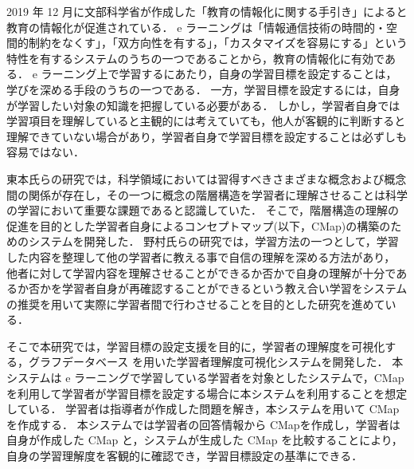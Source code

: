 \begin{titlepage}

    2019 年 12 月に文部科学省が作成した「教育の情報化に関する手引き」\cite{tebiki}によると教育の情報化が促進されている．
    e ラーニング\cite{e}は「情報通信技術の時間的・空間的制約をなくす」，「双方向性を有する」，「カスタマイズを容易にする」という特性を有するシステムのうちの一つであることから，教育の情報化に有効である．
    e ラーニング上で学習するにあたり，自身の学習目標を設定することは，学びを深める手段のうちの一つである\cite{seman}．
    一方，学習目標を設定するには，自身が学習したい対象の知識を把握している必要がある．
    しかし，学習者自身では学習項目を理解していると主観的には考えていても，他人が客観的に判断すると理解できていない場合があり，学習者自身で学習目標を設定することは必ずしも容易ではない．

    東本氏らの研究では，科学領域においては習得すべきさまざまな概念および概念間の関係が存在し，その一つに概念の階層構造を学習者に理解させることは科学の学習において重要な課題であると認識していた．
    そこで，階層構造の理解の促進を目的とした学習者自身によるコンセプトマップ(以下，CMap)\cite{concept}の構築のためのシステムを開発した\cite{toumoto}．
    野村氏らの研究では，学習方法の一つとして，学習した内容を整理して他の学習者に教える事で自信の理解を深める方法があり，
    他者に対して学習内容を理解させることができるか否かで自身の理解が十分であるか否かを学習者自身が再確認することができるという教え合い学習をシステムの推奨を用いて実際に学習者間で行わさせることを目的とした研究を進めている．\cite{nomura}

    そこで本研究では，学習目標の設定支援を目的に，学習者の理解度を可視化する，グラフデータベース を用いた学習者理解度可視化システムを開発した．
    本システムは e ラーニングで学習している学習者を対象としたシステムで，CMapを利用して学習者が学習目標を設定する場合に本システムを利用することを想定している．
    学習者は指導者が作成した問題を解き，本システムを用いて CMap を作成する．
    本システムでは学習者の回答情報から CMapを作成し，学習者は自身が作成した CMap と，システムが生成した CMap を比較することにより，自身の学習理解度を客観的に確認でき，学習目標設定の基準にできる．
    
    
\end{titlepage}